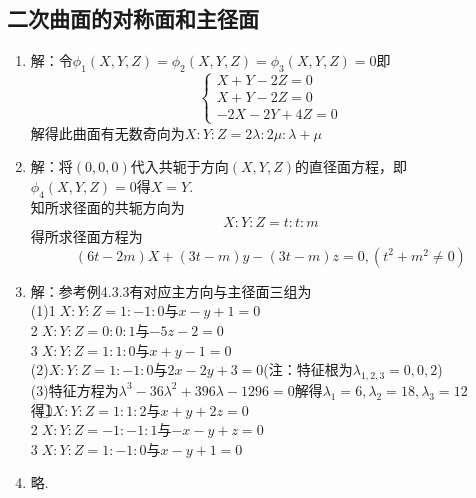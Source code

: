 \documentclass[UTF8]{ctexart}
\begin{document}
\subsection{二次曲面的对称面和主径面}
\begin{enumerate}

\item 解：令$\phi_1\left(X,Y,Z\right)=\phi_2\left(X,Y,Z\right)=\phi_3\left(X,Y,Z\right)=0$即
$$\left\{\begin{array}{l}X+Y-2Z=0\\X+Y-2Z=0\\-2X-2Y+4Z=0\end{array}\right.$$解得此曲面有无数奇向为$X:Y:Z=2\lambda:2\mu:\lambda+\mu$

\item 解：将$(0,0,0)$代入共轭于方向$(X,Y,Z)$的直径面方程，即$\phi_4(X,Y,Z)=0$得$X=Y$.\\
知所求径面的共轭方向为$$X:Y:Z=t:t:m$$
得所求径面方程为$$(6t-2m)X+(3t-m)y-(3t-m)z=0,(t^2+m^2\neq0)$$

\item 解：参考例4.3.3有对应主方向与主径面三组为\\
(1)\textcircled{1}$X:Y:Z=1:-1:0$与$x-y+1=0$\\
\textcircled{2}$X:Y:Z=0:0:1$与$-5z-2=0$\\
\textcircled{3}$X:Y:Z=1:1:0$与$x+y-1=0$\\
(2)$X:Y:Z=1:-1:0$与$2x-2y+3=0$(注：特征根为$\lambda_{1,2,3}=0,0,2$)\\
(3)特征方程为$\lambda^3-36\lambda^2+396\lambda-1296=0$解得$\lambda_1=6,\lambda_2=18,\lambda_3=12$\\
得\textcircled{1}$X:Y:Z=1:1:2$与$x+y+2z=0$\\
\textcircled{2}$X:Y:Z=-1:-1:1$与$-x-y+z=0$\\
\textcircled{3}$X:Y:Z=1:-1:0$与$x-y+1=0$\\

\item 略. 
\end{enumerate}
\end{document}
